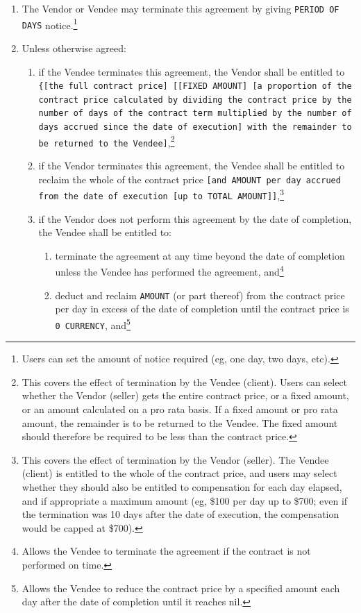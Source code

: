 \documentclass[a4paper,12pt]{article}
\begin{document}
\begin{enumerate}[resume]
	\item The Vendor or Vendee may terminate this agreement by giving \texttt{\colorbox{branding}{PERIOD OF DAYS}} notice.\footnote{Users can set the amount of notice required (eg, one day, two days, etc).}
	\item Unless otherwise agreed:
	\begin{enumerate}
			\item if the Vendee terminates this agreement, the Vendor shall be entitled to \texttt{\{[the full contract price] [[\texttt{\colorbox{branding}{FIXED AMOUNT}}] [a proportion of the contract price calculated by dividing the contract price by the number of days of the contract term multiplied by the number of days accrued since the date of execution] with the remainder to be returned to the Vendee]},\footnote{This covers the effect of termination by the Vendee (client). Users can select whether the Vendor (seller) gets the entire contract price, or a fixed amount, or an amount calculated on a pro rata basis. If a fixed amount or pro rata amount, the remainder is to be returned to the Vendee. The fixed amount should therefore be required to be less than the contract price.}
			\item if the Vendor terminates this agreement, the Vendee shall be entitled to reclaim the whole of the contract price \texttt{[and \colorbox{branding}{AMOUNT} per day accrued from the date of execution [up to \colorbox{branding}{TOTAL AMOUNT}]]},\footnote{This covers the effect of termination by the Vendor (seller). The Vendee (client) is entitled to the whole of the contract price, and users may select whether they should also be entitled to compensation for each day elapsed, and if appropriate a maximum amount (eg, \$100 per day up to \$700; even if the termination was 10 days after the date of execution, the compensation would be capped at \$700).}
			\item if the Vendor does not perform this agreement by the date of completion, the Vendee shall be entitled to:
			\begin{enumerate}
					\item terminate the agreement at any time beyond the date of completion unless the Vendee has performed the agreement, and\footnote{Allows the Vendee to terminate the agreement if the contract is not performed on time.}
					\item deduct and reclaim \texttt{\colorbox{branding}{AMOUNT}} (or part thereof) from the contract price per day in excess of the date of completion until the contract price is \texttt{\colorbox{branding}{0 CURRENCY}}, and\footnote{Allows the Vendee to reduce the contract price by a specified amount each day after the date of completion until it reaches nil.}

\end{enumerate}
\end{enumerate}
\end{enumerate}
\end{document}
